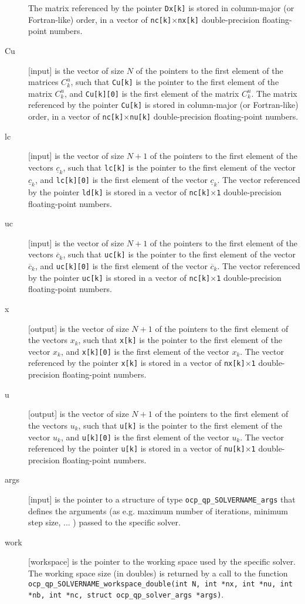 \documentclass{report}
\begin{document}
\begin{description}
The matrix referenced by the pointer {\tt Dx[k]} is stored in column-major (or Fortran-like) order, in a vector of {\tt nc[k]$\times$nx[k]} double-precision floating-point numbers.
\item[Cu] [input] is the vector of size $N$ of the pointers to the first element of the matrices $C^u_k$, such that {\tt Cu[k]} is the pointer to the first element of the matrix $C^u_k$, and {\tt Cu[k][0]} is the first element of the matrix $C^u_k$.
The matrix referenced by the pointer {\tt Cu[k]} is stored in column-major (or Fortran-like) order, in a vector of {\tt nc[k]$\times$nu[k]} double-precision floating-point numbers.
\item[lc] [input] is the vector of size $N+1$ of the pointers to the first element of the vectors $\underline c_k$, such that {\tt lc[k]} is the pointer to the first element of the vector $\underline c_k$, and {\tt lc[k][0]} is the first element of the vector $\underline c_k$.
The vector referenced by the pointer {\tt ld[k]} is stored in a vector of {\tt nc[k]$\times$1} double-precision floating-point numbers.
\item[uc] [input] is the vector of size $N+1$ of the pointers to the first element of the vectors $\overline c_k$, such that {\tt uc[k]} is the pointer to the first element of the vector $\overline c_k$, and {\tt uc[k][0]} is the first element of the vector $\overline c_k$.
The vector referenced by the pointer {\tt uc[k]} is stored in a vector of {\tt nc[k]$\times$1} double-precision floating-point numbers.
\item[x] [output] is the vector of size $N+1$ of the pointers to the first element of the vectors $x_k$, such that {\tt x[k]} is the pointer to the first element of the vector $x_k$, and {\tt x[k][0]} is the first element of the vector $x_k$.
The vector referenced by the pointer {\tt x[k]} is stored in a vector of {\tt nx[k]$\times$1} double-precision floating-point numbers.
\item[u] [output] is the vector of size $N+1$ of the pointers to the first element of the vectors $u_k$, such that {\tt u[k]} is the pointer to the first element of the vector $u_k$, and {\tt u[k][0]} is the first element of the vector $u_k$.
The vector referenced by the pointer {\tt u[k]} is stored in a vector of {\tt nu[k]$\times$1} double-precision floating-point numbers.
\item[args] [input] is the pointer to a structure of type {\tt ocp\_qp\_SOLVERNAME\_args} that defines the arguments (as e.g. maximum number of iterations, minimum step size, ... ) passed to the specific solver.
\item[work] [workspace] is the pointer to the working space used by the specific solver.
The working space size (in doubles) is returned by a call to the function {\tt ocp\_qp\_SOLVERNAME\_workspace\_double(int N, int *nx, int *nu, int *nb, int *nc, struct ocp\_qp\_solver\_args *args)}. 
\end{description}
\end{document}
